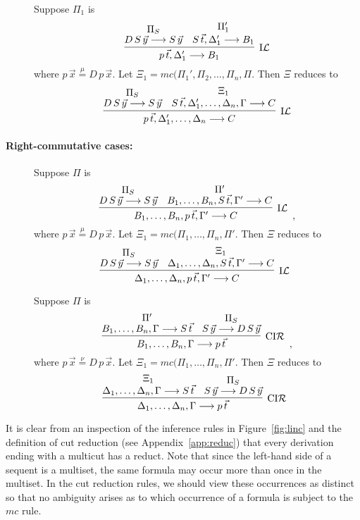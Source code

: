 \documentclass[preprint]{elsarticle}
\newcommand{\Seq}[2]{#1\longrightarrow #2}
\newcommand{\circL}{\circ{\cal L}}
\newcommand{\defmu}{\stackrel{\mu}{=}}
\newcommand{\defnu}{\stackrel{\nu}{=}}
\newcommand{\indL}{{\rm I}{\cal L}}
\newcommand{\coindR}{{\rm CI}{\cal R}}
\begin{document}
\begin{definition}
\begin{description}

\item[\fbox{$\indL/\circL$}] Suppose $\Pi_1$ is 
$$
\infer[\indL] {\Seq{p\,\vec{t}, \Delta_1'}{B_1}} {
  \deduce{\Seq{D\,S\,\vec{y}}{S\,\vec{y}}}{\Pi_S} &
  \deduce{\Seq{S\,\vec{t}, \Delta_1'}{B_1}}{\Pi_1'} }
$$      
where $p\,\vec{x} \defmu D\,p\,\vec{x}$.  
Let $\Xi_1 = mc(\Pi_1',\Pi_2,\ldots,\Pi_n, \Pi$.
Then $\Xi$ reduces to
$$
\infer[\indL] {\Seq{p\,\vec{t}, \Delta_1',\dots,\Delta_n}{C}} {
  \deduce{\Seq{D\,S\,\vec{y}}{S\,\vec{y}}}{\Pi_S} &
  \deduce{\Seq{S\,\vec{t}, \Delta_1',\dots,\Delta_n,\Gamma}{C}}{\Xi_1}
}
$$      
\end{description}

\paragraph{Right-commutative cases:}

\begin{description}


\item[\fbox{$-/\indL$}] Suppose $\Pi$ is 
$$
\infer[\indL] {\Seq{B_1,\dots,B_n, p\,\vec{t},\Gamma'} {C}} {
  \deduce{\Seq{D\,S\,\vec{y}}{S\,\vec{y}}}{\Pi_S} &
  \deduce{\Seq{B_1,\dots,B_n, S\,\vec{t}, \Gamma'}{C}}{\Pi'} }
\enspace ,
$$      
where $p\,\vec{x} \defmu D\,p\,\vec{x}$.  
Let $\Xi_1 = mc(\Pi_1,\ldots,\Pi_n, \Pi'$. 
Then $\Xi$ reduces to
$$
\infer[\indL] {\Seq{\Delta_1,\dots,\Delta_n, p\,\vec{t},\Gamma'}{C}} {
  \deduce{\Seq{D\,S\,\vec{y}}{S\,\vec{y}}}{\Pi_S} &
  \deduce{\Seq{\Delta_1,\dots,\Delta_n, S\,\vec{t}, \Gamma'}{C}}{\Xi_1}
} \enspace 
$$      


\item[\fbox{$-/\coindR$}] Suppose $\Pi$ is 
$$
\infer[\coindR] {\Seq{B_1,\dots,B_n,\Gamma}{p\,\vec{t}}} {
  \deduce{\Seq{B_1,\dots,B_n,\Gamma} {S\,\vec{t}}}{\Pi'} &
  \deduce{\Seq{S\,\vec{y}}{D\,S\,\vec{y}}}{\Pi_S} } \enspace ,
$$
where $p\,\vec{x} \defnu D\,p\,\vec{x}$.  
Let $\Xi_1 = mc(\Pi_1,\ldots,\Pi_n,\Pi'$.
Then $\Xi$ reduces to
$$
\infer[\coindR] {\Seq{\Delta_1,\dots,\Delta_n,\Gamma}{p\,\vec{t}}} {
  \deduce{\Seq{\Delta_1,\dots,\Delta_n,\Gamma} {S\,\vec{t}}}{\Xi_1} &
  \deduce{\Seq{S\,\vec{y}}{D\,S\,\vec{y}}}{\Pi_S} } \enspace
$$
\end{description}


\end{definition}



It is clear from an inspection of the inference rules in
Figure~\ref{fig:linc} and the definition of cut reduction (see
Appendix~\ref{app:reduc}) that every
derivation ending with a multicut has a reduct. 
Note that since the left-hand
side of a sequent is a multiset, the same formula may 
occur more than once in the multiset. In the cut reduction rules,
we should view these occurrences as distinct so that no ambiguity
arises as to which occurrence of a formula is subject to
the $mc$ rule. 
\end{document}
